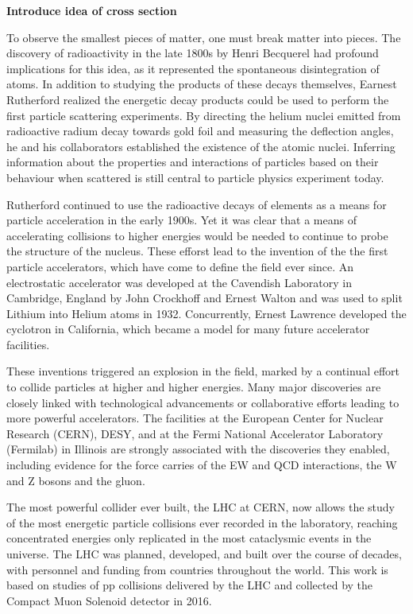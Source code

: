 \textbf{Introduce idea of cross section}

To observe the smallest pieces of matter, one must break matter into pieces.
The discovery of radioactivity in the late 1800s by Henri Becquerel had
profound implications for this idea, as it represented the spontaneous
disintegration of atoms. 
In addition to studying the products of these decays themselves, 
Earnest Rutherford realized the energetic decay products could be used
to perform the first particle scattering experiments. By directing the 
helium nuclei emitted from radioactive radium decay towards gold foil
and measuring the deflection
angles, he and his collaborators established the existence of the atomic nuclei.
Inferring information about the properties and interactions of particles based on their
behaviour when scattered is still central to particle physics experiment today.

Rutherford continued to use the radioactive decays of elements as a means
for particle acceleration in the early 1900s. Yet it was clear that
a means of accelerating collisions to higher energies would be needed
to continue to probe the structure of the nucleus.
These efforst lead to the invention of the 
the first particle accelerators, which have come to define the field ever since.
An electrostatic accelerator was developed at the Cavendish Laboratory
in Cambridge, England by John Crockhoff and Ernest Walton and
was used to split Lithium into Helium atoms in 1932.
Concurrently, Ernest Lawrence developed the cyclotron in California,
which became a model for many future accelerator facilities.

These inventions triggered an explosion in the field, marked by a continual 
effort to collide particles at higher and higher energies. Many major discoveries
are closely linked with technological advancements or collaborative
efforts leading to more powerful accelerators.
The facilities at the European Center for Nuclear
Research (CERN), DESY, and at the 
Fermi National Accelerator Laboratory (Fermilab) in Illinois
are strongly associated with the 
discoveries they enabled, including evidence for the force carries
of the EW and QCD interactions, the W and Z bosons and the gluon.

The most powerful collider ever built, the LHC at CERN,
now allows the study of the most energetic particle collisions ever
recorded in the laboratory, reaching concentrated energies only replicated
in the most cataclysmic events in the universe. The LHC
was planned, developed, and built over the course of decades, with
personnel and funding from countries throughout the world.
This work is based on studies of pp collisions delivered by the LHC 
and collected by the Compact Muon Solenoid detector in 2016.

